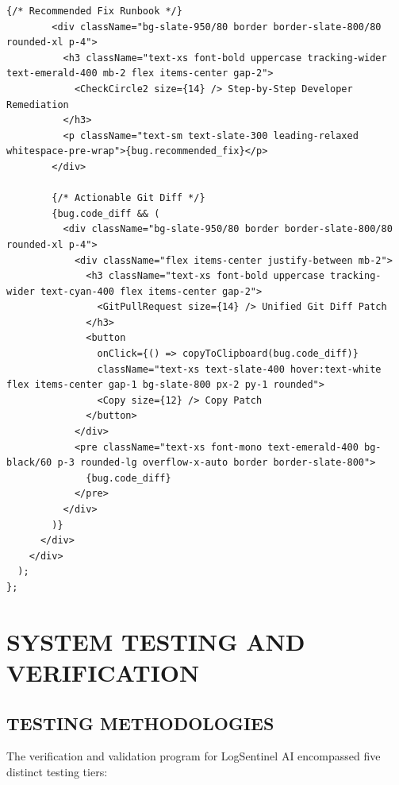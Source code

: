\documentclass[12pt,a4paper]{article}
\begin{document}
\begin{lstlisting}[style=pystyle, caption={React 19 TypeScript AI Root-Cause and Git Diff Viewer Component}]
        {/* Recommended Fix Runbook */}
        <div className="bg-slate-950/80 border border-slate-800/80 rounded-xl p-4">
          <h3 className="text-xs font-bold uppercase tracking-wider text-emerald-400 mb-2 flex items-center gap-2">
            <CheckCircle2 size={14} /> Step-by-Step Developer Remediation
          </h3>
          <p className="text-sm text-slate-300 leading-relaxed whitespace-pre-wrap">{bug.recommended_fix}</p>
        </div>

        {/* Actionable Git Diff */}
        {bug.code_diff && (
          <div className="bg-slate-950/80 border border-slate-800/80 rounded-xl p-4">
            <div className="flex items-center justify-between mb-2">
              <h3 className="text-xs font-bold uppercase tracking-wider text-cyan-400 flex items-center gap-2">
                <GitPullRequest size={14} /> Unified Git Diff Patch
              </h3>
              <button 
                onClick={() => copyToClipboard(bug.code_diff)}
                className="text-xs text-slate-400 hover:text-white flex items-center gap-1 bg-slate-800 px-2 py-1 rounded">
                <Copy size={12} /> Copy Patch
              </button>
            </div>
            <pre className="text-xs font-mono text-emerald-400 bg-black/60 p-3 rounded-lg overflow-x-auto border border-slate-800">
              {bug.code_diff}
            </pre>
          </div>
        )}
      </div>
    </div>
  );
};
\end{lstlisting}

\clearpage
\section{SYSTEM TESTING AND VERIFICATION}\label{sec:system_testing}

\subsection{TESTING METHODOLOGIES}
The verification and validation program for LogSentinel AI encompassed five distinct testing tiers:
\end{document}
